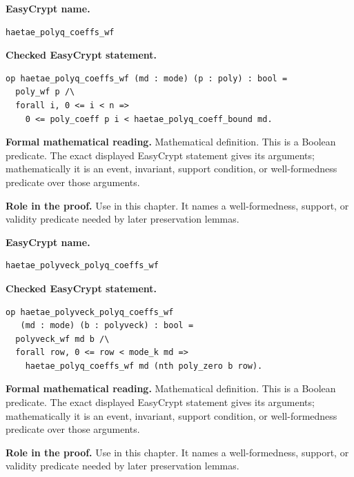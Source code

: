 \begin{formaldefinition}
\noindent\textbf{EasyCrypt name.}
\begin{lstlisting}[language=EasyCrypt,basicstyle=\ttfamily\scriptsize]
haetae_polyq_coeffs_wf
\end{lstlisting}
\noindent\textbf{Checked EasyCrypt statement.}
\begin{lstlisting}[language=EasyCrypt,basicstyle=\ttfamily\scriptsize]
op haetae_polyq_coeffs_wf (md : mode) (p : poly) : bool =
  poly_wf p /\
  forall i, 0 <= i < n =>
    0 <= poly_coeff p i < haetae_polyq_coeff_bound md.
\end{lstlisting}
\noindent\textbf{Formal mathematical reading.}
Mathematical definition. This is a Boolean predicate.  The exact displayed EasyCrypt statement gives its arguments; mathematically it is an event, invariant, support condition, or well-formedness predicate over those arguments.

\noindent\textbf{Role in the proof.}
Use in this chapter. It names a well-formedness, support, or validity predicate needed by later preservation lemmas.

\end{formaldefinition}

\begin{formaldefinition}
\noindent\textbf{EasyCrypt name.}
\begin{lstlisting}[language=EasyCrypt,basicstyle=\ttfamily\scriptsize]
haetae_polyveck_polyq_coeffs_wf
\end{lstlisting}
\noindent\textbf{Checked EasyCrypt statement.}
\begin{lstlisting}[language=EasyCrypt,basicstyle=\ttfamily\scriptsize]
op haetae_polyveck_polyq_coeffs_wf
   (md : mode) (b : polyveck) : bool =
  polyveck_wf md b /\
  forall row, 0 <= row < mode_k md =>
    haetae_polyq_coeffs_wf md (nth poly_zero b row).
\end{lstlisting}
\noindent\textbf{Formal mathematical reading.}
Mathematical definition. This is a Boolean predicate.  The exact displayed EasyCrypt statement gives its arguments; mathematically it is an event, invariant, support condition, or well-formedness predicate over those arguments.

\noindent\textbf{Role in the proof.}
Use in this chapter. It names a well-formedness, support, or validity predicate needed by later preservation lemmas.

\end{formaldefinition}

